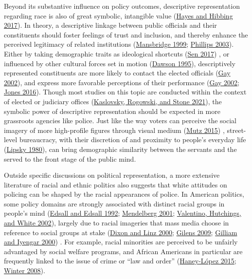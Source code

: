 \documentclass[
  12pt,
]{article}
\begin{document}
Beyond its substantive influence on policy outcomes, descriptive
representation regarding race is also of great symbolic, intangible
value (\protect\hyperlink{ref-hayes2017}{Hayes and Hibbing 2017}). In
theory, a descriptive linkage between public officials and their
constituents should foster feelings of trust and inclusion, and thereby
enhance the perceived legitimacy of related institutions
(\protect\hyperlink{ref-mansbridge1999}{Mansbridge 1999};
\protect\hyperlink{ref-phillips2003}{Phillips 2003}). Either by taking
demographic traits as ideological shortcuts
(\protect\hyperlink{ref-sen2017}{Sen 2017}) , or influenced by other
cultural forces set in motion (\protect\hyperlink{ref-dawson1995}{Dawson
1995}), descriptively represented constituents are more likely to
contact the elected officials (\protect\hyperlink{ref-gay2002}{Gay
2002}), and express more favorable perceptions of their performance
(\protect\hyperlink{ref-gay2002}{Gay 2002};
\protect\hyperlink{ref-jones2016}{Jones 2016}). Though most studies on
this topic are conducted within the context of elected or judiciary
offices (\protect\hyperlink{ref-kaslovsky2021}{Kaslovsky, Rogowski, and
Stone 2021}), the symbolic power of descriptive representation should be
expected in more grassroots agencies like police. Just like the way
voters can perceive the social imagery of more high-profile figures
through visual medium (\protect\hyperlink{ref-mutz2015}{Mutz 2015}) ,
street-level bureaucracy, with their discretion of and proximity to
people's everyday life (\protect\hyperlink{ref-lipsky1980}{Lipsky
1980}), can bring demographic similarity between the servants and the
served to the front stage of the public mind.

Outside specific discussions on political representation, a more
extensive literature of racial and ethnic politics also suggests that
white attitudes on policing can be shaped by the racial appearances of
police. In American politics, some policy domains are strongly
associated with distinct racial groups in people's mind
(\protect\hyperlink{ref-edsall1992}{Edsall and Edsall 1992};
\protect\hyperlink{ref-mendelberg2001}{Mendelberg 2001};
\protect\hyperlink{ref-valentino2002}{Valentino, Hutchings, and White
2002}), largely due to racial imageries that mass media choose in
reference to social groups at stake
(\protect\hyperlink{ref-dixon2000}{Dixon and Linz 2000};
\protect\hyperlink{ref-gilens2009}{Gilens 2009};
\protect\hyperlink{ref-gilliam2000}{Gilliam and Iyengar 2000}) . For
example, racial minorities are perceived to be unfairly advantaged by
social welfare programs, and African Americans in particular are
frequently linked to the issue of crime or ``law and order''
(\protect\hyperlink{ref-haney-luxf3pez2015}{Haney-López 2015};
\protect\hyperlink{ref-winter2008}{Winter 2008}).
\end{document}
